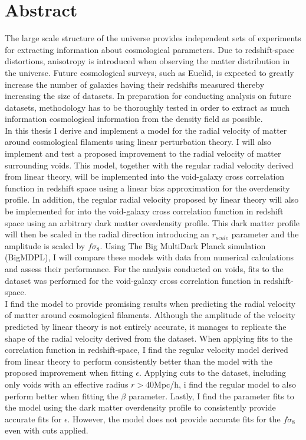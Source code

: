 \chapter*{Abstract}
The large scale structure of the universe provides independent sets of experiments for extracting information about cosmological parameters. Due to redshift-space distortions, anisotropy is introduced when observing the matter distribution in the universe.
Future cosmological surveys, such as Euclid, is expected to greatly increase the number of galaxies having their redshifts measured thereby increasing the size of datasets. In preparation for conducting analysis on future datasets, methodology has to be thoroughly tested in order to extract as much information cosmological information from the density field as possible.\\\indent
In this thesis I derive and implement a model for the radial velocity of matter around cosmological filaments using linear perturbation theory. I will also implement and test a proposed improvement to the radial velocity of matter surrounding voids\cite{Achitouv_streaming}. This model, together with the regular radial velocity derived from linear theory, will be implemented into the void-galaxy cross correlation function in redshift space using a linear bias approximation for the overdensity profile. In addition, the regular radial velocity proposed by linear theory will also be implemented for into the void-galaxy cross correlation function in redshift space using an arbitrary dark matter overdensity profile. This dark matter profile will then be scaled in the radial direction introducing an $r_{scale}$ parameter and the amplitude is scaled by $f\sigma_8$. Using The Big MultiDark Planck simulation (BigMDPL)\cite{Multidark_dataset}, I will compare these models with data from numerical calculations and assess their performance. For the analysis conducted on voids, fits to the dataset was performed for the void-galaxy cross correlation function in redshift-space. 
\\\indent
I find the model to provide promising results when predicting the radial velocity of matter around cosmological filaments. Although the amplitude of the velocity predicted by linear theory is not entirely accurate, it manages to replicate the shape of the radial velocity derived from the dataset. When applying fits to the correlation function in redshift-space, I find the regular velocity model derived from linear theory to perform consistently better than the model with the proposed improvement when fitting $\epsilon$. Applying cuts to the dataset, including only voids with an effective radius $r>40$Mpc/h, i find the regular model to also perform better when fitting the $\beta$ parameter. Lastly, I find the parameter fits to the model using the dark matter overdensity profile to consistently provide accurate fits for $\epsilon$. However, the model does not provide accurate fits for the $f\sigma_8$ even with cuts applied.
\\\indent